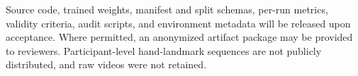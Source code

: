 Source code, trained weights, manifest and split schemas, per-run metrics, validity criteria, audit scripts, and environment metadata will be released upon acceptance. Where permitted, an anonymized artifact package may be provided to reviewers. Participant-level hand-landmark sequences are not publicly distributed, and raw videos were not retained.